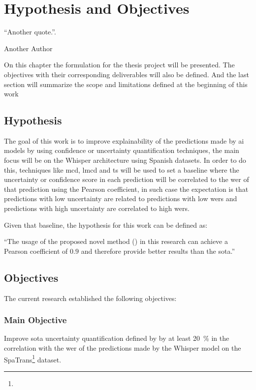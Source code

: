 \chapter{Hypothesis and Objectives}
\label{chapter:hypothesis-objectives}
\epigraph{``Another quote.''.}{\vspace{10pt}Another Author}

\newpage


On this chapter the formulation for the thesis project will be presented. The objectives with their corresponding deliverables will also be defined. And the last section will summarize the scope and limitations defined at the beginning of this work



\section{Hypothesis}
\label{section:hypothesis}

The goal of this work is to improve explainability of the predictions made by \acrshort{ai} models by using confidence or uncertainty quantification techniques, the main focus will be on the Whisper\cite{radford2023robust} architecture using Spanish datasets. In order to do this, techniques like \acrshort{mcd}, \acrshort{lmcd} and \acrshort{ts} will be used to set a baseline where the uncertainty or confidence score in each prediction will be correlated to the \acrshort{wer} of that prediction using the Pearson coefficient, in such case the expectation is that predictions with low uncertainty are related to predictions with low \acrshort{wer}s and predictions with high uncertainty are correlated to high \acrshort{wer}s.

Given that baseline, the hypothesis for this work can be defined as:

``The usage of the proposed novel method () in this research can achieve a Pearson coefficient of $0.9$ and therefore provide better results than the \acrshort{sota}.''

\section{Objectives}
\label{section:objectives}
The current research established the following objectives:

\subsection{Main Objective}
\label{section:main-objective}
\label{objective:main}
Improve \acrshort{sota} uncertainty quantification defined by \cite{rodriguez2024uncertainty} by at least \qty{20}{\percent} in the correlation with the \acrshort{wer} of the predictions made by the Whisper model on the SpaTrans\footnote{} dataset.

